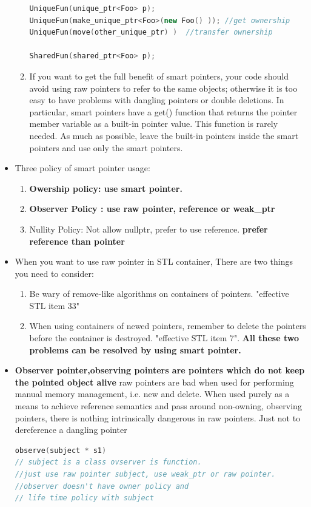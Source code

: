 \documentclass[a4paper,12pt,twoside]{book}
\begin{document}
\begin{itemize}
\begin{enumerate}
\begin{lstlisting}[frame=single, language=c++]
UniqueFun(unique_ptr<Foo> p);
UniqueFun(make_unique_ptr<Foo>(new Foo() )); //get ownership
UniqueFun(move(other_unique_ptr) )  //transfer ownership

SharedFun(shared_ptr<Foo> p);
\end{lstlisting}

\item If you want to get the full benefit of smart pointers, your code should avoid using raw pointers to refer to the same objects; otherwise it is too easy to have problems with dangling pointers or double deletions. In particular, smart pointers have a get() function that returns the pointer member variable as a built-in pointer value. This function is rarely needed. As much as possible, leave the built-in pointers inside the smart pointers and use only the smart pointers.
\end{enumerate}


\item Three policy of smart pointer usage:
\begin{enumerate}
\item \textbf{Owership policy: use smart pointer.}
\item \textbf{Observer Policy : use raw pointer, reference or weak\_ptr}
\item Nullity Policy: Not allow nullptr, prefer to use reference. \textbf{prefer reference than pointer}
\end{enumerate}


\item When you want to use raw pointer in STL container, There are two things you need to consider:
\begin{enumerate}
\item  Be wary of remove-like algorithms on containers of pointers. "effective STL item 33"
\item When using containers of newed pointers, remember to delete the pointers before the container is destroyed. "effective STL item 7". \textbf{All these two problems can be resolved by using smart pointer.}
\end{enumerate}

\item \textbf{Observer pointer,observing pointers are pointers which do not keep the pointed object alive} raw pointers are bad when used for performing manual memory management, i.e. new and delete. When used purely as a means to achieve reference semantics and pass around non-owning, observing pointers, there is nothing intrinsically dangerous in raw pointers. Just not to dereference a dangling pointer
\begin{lstlisting}[frame=single, language=c++]
observe(subject * s1)
// subject is a class ovserver is function.
//just use raw pointer subject, use weak_ptr or raw pointer.
//observer doesn't have owner policy and
// life time policy with subject
\end{lstlisting}


\end{itemize}
\end{document}
